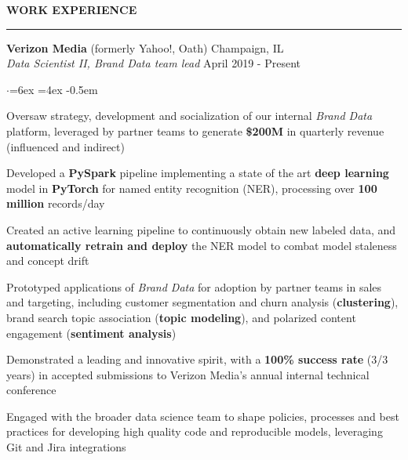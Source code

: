 \documentclass[11pt]{article}
\newenvironment{rSection}[1]{ %
  \sectionskip
  \MakeUppercase{\bf #1} %
  \sectionlineskip
  \hrule %
  \begin{list}{}{ %
    \setlength{\leftmargin}{1.5em} %
  }
  \item[]
}{
  \end{list}
}
\def\sectionlineskip{\smallskip} %
\def\sectionskip{\smallskip} %
\begin{document}
\begin{rSection}{Work Experience}
{\bf Verizon Media} (formerly Yahoo!, Oath) \hfill Champaign, IL \\
{\em \hspace*{2ex} Data Scientist II, Brand Data team lead} \hfill April 2019 - Present

\begin{list}{$\cdot$}{\leftmargin=6ex \rightmargin=4ex} %
   \itemsep -0.5em \vspace{-0.5em} %
   \item Oversaw strategy, development and socialization of our internal \textit{Brand Data} platform, leveraged by partner teams to generate \textbf{\$200M} in quarterly revenue (influenced and indirect)
   \item Developed a \textbf{PySpark} pipeline implementing a state of the art \textbf{deep learning} model in \textbf{PyTorch} for named entity recognition (NER), processing over \textbf{100 million} records/day
   \item Created an active learning pipeline to continuously obtain new labeled data, and \textbf{automatically retrain and deploy} the NER model to combat model staleness and concept drift
   \item Prototyped applications of \textit{Brand Data} for adoption by partner teams in sales and targeting, including customer segmentation and churn analysis (\textbf{clustering}), brand search topic association (\textbf{topic modeling}), and polarized content engagement (\textbf{sentiment analysis})
   \item Demonstrated a leading and innovative spirit, with a \textbf{100\% success rate} (3/3 years) in accepted submissions to Verizon Media's annual internal technical conference
   \item Engaged with the broader data science team to shape policies, processes and best practices for developing high quality code and reproducible models, leveraging Git and Jira integrations
\end{list}


\end{rSection}
\end{document}

